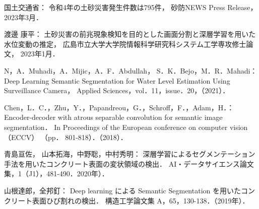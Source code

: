 \documentclass[a4j,twocolumn,10pt]{jarticle}
\begin{document}
\begin{thebibliography}{9}

  国土交通省：
  令和4年の土砂災害発生件数は795件，
  砂防NEWS Press Release，2023年3月．
      
  渡邊 康平：
  土砂災害の前兆現象検知を目的とした画面分割と深層学習を用いた水位変動の推定，
  広島市立大学大学院情報科学研究科システム工学専攻修士論文，
  2023年1月．
      
  N，A．Muhadi，A．Mijic，A．F．Abdullah，
  S．K．Bejo，M．R．Mahadi：
  Deep Learning Semantic Segmentation for Water Level Estimation Using Surveillance Camera，
  Applied Sciences，vol．11，issue．20，（2021）．
    
  
  Chen，L．C．，Zhu，Y．，Papandreou，G．，Schroff，F．，Adam，H．：
  Encoder-decoder with atrous separable convolution for semantic image segmentation．
  In Proceedings of the European conference on computer vision （ECCV） （pp． 801-818）．（2018）．
      
  青島亘佐， 山本拓海，中野聡，中村秀明：
  深層学習によるセグメンテーション手法を用いたコンクリート表面の変状領域の検出．
  AI・データサイエンス論文集，1（J1），481-490．2020年）．
      
  山根達郎，全邦釘： 
  Deep learning による Semantic Segmentation を用いたコンクリート表面ひび割れの検出．
  構造工学論文集 A，65，130-138．（2019年）．
      
\end{thebibliography}
    
\end{document}
